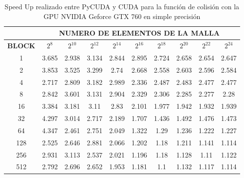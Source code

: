 \begin{table}[h!]
\centering
    \begin{tabular}{|c|c|c|c|c|c|c|c|c|c|}
    \hline
                   & \multicolumn{9}{c|}{\textbf{NUMERO DE ELEMENTOS DE LA MALLA}} \\ \hline
    \textbf{BLOCK} & $2^{8}$ & $2^{10}$& $2^{12}$& $2^{14}$& $2^{16}$& $2^{18}$& $2^{20}$& $2^{22}$& $2^{24}$\\ \hline
		1                               & 3.685   & 2.938    & 3.134    & 2.844    & 2.895    & 2.724    & 2.658    & 2.654    & 2.647 \\ \hline
		2                               & 3.853   & 3.525    & 3.299    & 2.74     & 2.668    & 2.558    & 2.603    & 2.596    & 2.584 \\ \hline
		4                               & 2.717   & 2.809    & 3.182    & 2.989    & 2.336    & 2.487    & 2.483    & 2.477    & 2.477 \\ \hline
		8                               & 2.842   & 3.601    & 3.131    & 2.904    & 2.329    & 2.306    & 2.285    & 2.277    & 2.28  \\ \hline
		16                              & 3.384   & 3.181    & 3.11     & 2.83     & 2.101    & 1.977    & 1.942    & 1.932    & 1.939 \\ \hline
		32                              & 4.297   & 3.014    & 2.717    & 2.189    & 1.707    & 1.436    & 1.492    & 1.476    & 1.473 \\ \hline
		64                              & 4.347   & 2.461    & 2.751    & 2.049    & 1.322    & 1.29     & 1.236    & 1.222    & 1.227 \\ \hline
		128                             & 2.525   & 2.646    & 2.881    & 2.066    & 1.202    & 1.18     & 1.211    & 1.141    & 1.114 \\ \hline
		256                             & 2.931   & 3.113    & 2.537    & 2.021    & 1.196    & 1.18     & 1.128    & 1.11     & 1.122 \\ \hline
		512                             & 2.792   & 2.696    & 2.652    & 1.953    & 1.181    & 1.1      & 1.132    & 1.117    & 1.114 \\ \hline
    \end{tabular}
    \caption{Speed Up realizado entre PyCUDA y CUDA para la función de colisión con la GPU NVIDIA Geforce GTX 760 en simple precisión}
    \label{tab:s_py_760_test_simple_10}
    \end{table}